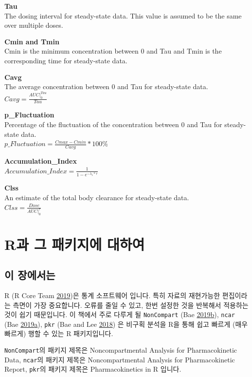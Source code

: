 \documentclass[12pt,]{krantz}
\begin{document}
\textbf{Tau}\\
The dosing interval for steady-state data. This value is assumed to be the same over multiple doses.

\textbf{Cmin and Tmin}\\
Cmin is the minimum concentration between 0 and Tau and Tmin is the corresponding time for steady-state data.

\textbf{Cavg}\\
The average concentration between 0 and Tau for steady-state data.\\
\(Cavg = \frac{AUC|_{0}^{Tau}}{Tau}\)

\textbf{p\_Fluctuation}\\
Percentage of the fluctuation of the concentration between 0 and Tau for steady-state data.\\
\(p\_Fluctuation = \frac{Cmax-Cmin}{Cavg}*100\%\)

\textbf{Accumulation\_Index}\\
\(Accumulation\_Index = \frac{1}{1-e^{-\lambda_{z}*\tau}}\)

\textbf{Clss}\\
An estimate of the total body clearance for steady-state data.\\
\(Clss = \frac{Dose}{AUC|_{0}^{\tau}}\)

\hypertarget{R-and-packages}{%
\chapter{R과 그 패키지에 대하여}\label{R-and-packages}}

\hypertarget{summary-r-packages}{%
\section{이 장에서는}\label{summary-r-packages}}

R (R Core Team \protect\hyperlink{ref-R-base}{2019})은 통계 소프트웨어 입니다.
특히 자료의 재현가능한 편집이라는 측면이 가장 중요합니다. 오류를 줄일 수 있고, 한번 설정한 것을 반복해서 적용하는 것이 쉽기 때문입니다.
이 책에서 주로 다루게 될 \texttt{NonCompart} (Bae \protect\hyperlink{ref-R-NonCompart}{2019}\protect\hyperlink{ref-R-NonCompart}{b}), \texttt{ncar} (Bae \protect\hyperlink{ref-R-ncar}{2019}\protect\hyperlink{ref-R-ncar}{a}), \texttt{pkr} (Bae and Lee \protect\hyperlink{ref-R-pkr}{2018}) 은 비구획 분석을 R을 통해 쉽고 빠르게 (매우 빠르게) 행할 수 있는 R 패키지입니다.

\texttt{NonCompart}의 패키지 제목은 Noncompartmental Analysis for Pharmacokinetic Data,
\texttt{ncar}의 패키지 제목은 Noncompartmental Analysis for Pharmacokinetic Report,
\texttt{pkr}의 패키지 제목은 Pharmacokinetics in R 입니다.
\end{document}
